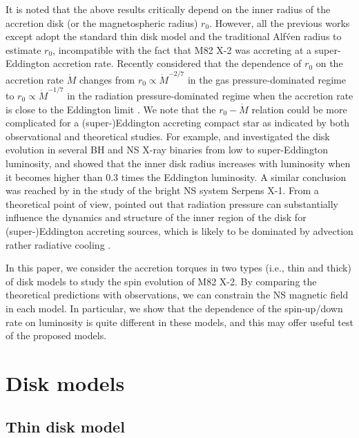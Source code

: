 \documentclass[12pt,preprint]{aastex}
\begin{document}
It is noted that the above results critically depend on the inner radius of the accretion disk (or the magnetospheric radius) $r_0$. However, all the previous works except \citet{dpp2016} adopt the standard thin disk model and the traditional Alf\'ven radius to estimate $r_0$, incompatible with the fact that M82 X-2 was accreting at a super-Eddington accretion rate. Recently \citet{dpp2016} considered that the dependence of $r_0$ on the accretion rate $\dot{M}$ changes from $r_0\propto \dot{M}^{-2/7}$ in the gas pressure-dominated regime to $r_0\propto \dot{M}^{-1/7}$ in the radiation pressure-dominated regime when the accretion rate is close to the Eddington limit \citep{g1996}.  We note that the $r_0-\dot{M}$ relation could be more complicated for a (super-)Eddington accreting compact star as indicated by both observational and theoretical studies. For example, \citet{wz2011} and \citet{wzz2014} investigated the disk evolution in several BH and NS X-ray binaries from low to super-Eddington luminosity, and showed that the inner disk radius increases with luminosity when it becomes higher than 0.3 times the Eddington luminosity. A similar conclusion was reached by \citet{cmcmbs2016} in the study of the bright NS system Serpens X-1. From a theoretical point of view, \citet{aghw2005} pointed out that radiation pressure can substantially influence the dynamics and structure of the inner region of the disk for (super-)Eddington accreting sources, which is likely to be dominated by advection rather radiative cooling \citep{ny1994}.

In this paper, we consider the accretion torques in two types (i.e., thin and thick) of disk models to study the spin evolution of M82 X-2.  By comparing the theoretical predictions with observations, we can constrain the NS magnetic field in each model. In particular, we show that the dependence of the spin-up/down rate on luminosity is quite different in these models, and this may offer useful test of the proposed models.


\section{Disk models}


\subsection{Thin disk model}
\end{document}
